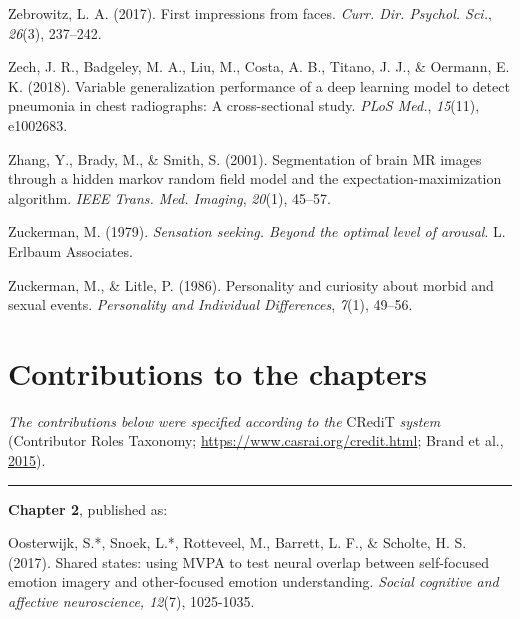 \documentclass[11pt,american,a4paper,oneside,]{memoir} %
\begin{document}
\leavevmode\hypertarget{ref-Zebrowitz2017-qe}{}%
Zebrowitz, L. A. (2017). First impressions from faces. \emph{Curr. Dir. Psychol. Sci.}, \emph{26}(3), 237--242.

\leavevmode\hypertarget{ref-Zech2018-bq}{}%
Zech, J. R., Badgeley, M. A., Liu, M., Costa, A. B., Titano, J. J., \& Oermann, E. K. (2018). Variable generalization performance of a deep learning model to detect pneumonia in chest radiographs: A cross-sectional study. \emph{PLoS Med.}, \emph{15}(11), e1002683.

\leavevmode\hypertarget{ref-Zhang2001-wa}{}%
Zhang, Y., Brady, M., \& Smith, S. (2001). Segmentation of brain MR images through a hidden markov random field model and the expectation-maximization algorithm. \emph{IEEE Trans. Med. Imaging}, \emph{20}(1), 45--57.

\leavevmode\hypertarget{ref-zuckerman1979}{}%
Zuckerman, M. (1979). \emph{Sensation seeking. Beyond the optimal level of arousal}. L. Erlbaum Associates.

\leavevmode\hypertarget{ref-zuckerman1986personality}{}%
Zuckerman, M., \& Litle, P. (1986). Personality and curiosity about morbid and sexual events. \emph{Personality and Individual Differences}, \emph{7}(1), 49--56.

\endgroup

\hypertarget{contributions-to-the-chapters}{%
\chapter*{Contributions to the chapters}\label{contributions-to-the-chapters}}

\setlength{\parindent}{0pt}
\small

\emph{The contributions below were specified according to the} CRediT \emph{system} (Contributor Roles Taxonomy; \url{https://www.casrai.org/credit.html}; Brand et al., \protect\hyperlink{ref-brand2015beyond}{2015}).

\begin{center}\rule{0.5\linewidth}{0.5pt}\end{center}

\textbf{Chapter 2}, published as:

Oosterwijk, S.*, Snoek, L.*, Rotteveel, M., Barrett, L. F., \& Scholte, H. S. (2017). Shared states: using MVPA to test neural overlap between self-focused emotion imagery and other-focused emotion understanding. \emph{Social cognitive and affective neuroscience, 12}(7), 1025-1035.
\end{document}
